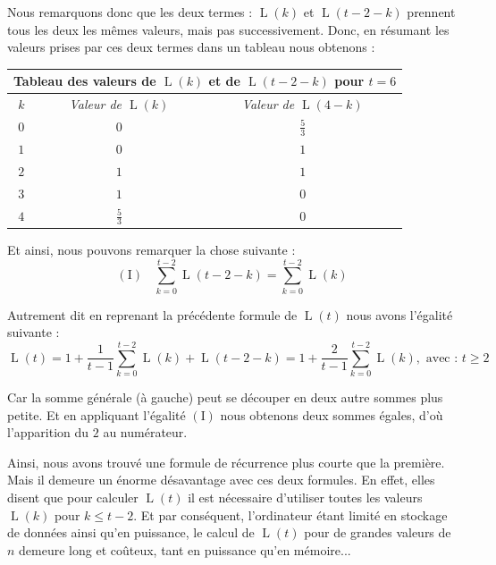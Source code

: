 \documentclass[a4paper,francais,11pt]{article}
\begin{document}
Nous remarquons donc que les deux termes : $\operatorname{L}\left(k\right)$ et $\operatorname{L}\left(t-2-k\right)$ prennent tous les deux les mêmes valeurs, mais pas successivement. Donc, en résumant les valeurs prises par ces deux termes dans un tableau nous obtenons :
\begin{center}
\begin{tabular}{|c||c|c|}
    \hline
    \multicolumn{3}{|c|}{\textbf{Tableau des valeurs de $\operatorname{L}\left(k\right)$ et de $\operatorname{L}\left(t-2-k\right)$ pour $t=6$}} \\ \hline\hline
        \multirow{1}{*}{\emph{$k$}} & \emph{Valeur de $\operatorname{L}\left(k\right)$} & \emph{Valeur de $\operatorname{L}\left(4-k\right)$} \\ \hline\hline
        \multirow{1}{*}{$0$} & $0$ & $\frac{5}{3}$ \\ \hline
        \multirow{1}{*}{$1$} & $0$ & $1$ \\ \hline
        \multirow{1}{*}{$2$} & $1$ & $1$ \\ \hline
        \multirow{1}{*}{$3$} & $1$ & $0$ \\ \hline
        \multirow{1}{*}{$4$} & $\frac{5}{3}$ & $0$ \\
    \hline
\end{tabular}
\end{center}

Et ainsi, nous pouvons remarquer la chose suivante :
\[(\text{I})\ \ \ \ \sum_{k=0}^{t-2}\operatorname{L}\left(t-2-k\right)=\sum_{k=0}^{t-2}\operatorname{L}\left(k\right)\]

Autrement dit en reprenant la précédente formule de $\operatorname{L}\left(t\right)$ nous avons l'égalité suivante :
\[\operatorname{L}\left(t\right)=1+\frac{1}{t-1}\sum_{k=0}^{t-2}\operatorname{L}\left(k\right) + \operatorname{L}\left(t-2-k\right)=1+\frac{2}{t-1}\sum_{k=0}^{t-2}\operatorname{L}\left(k\right),\text{ avec : $t\geqslant2$}\]

Car la somme générale (à gauche) peut se découper en deux autre sommes plus petite. Et en appliquant l'égalité $(\text{I})$ nous obtenons deux sommes égales, d'où l'apparition du $2$ au numérateur.

Ainsi, nous avons trouvé une formule de récurrence plus courte que la première. Mais il demeure un énorme désavantage avec ces deux formules. En effet, elles disent que pour calculer $\operatorname{L}\left(t\right)$ il est nécessaire d'utiliser toutes les valeurs $\operatorname{L}\left(k\right)$ pour $k\leqslant t-2$. Et par conséquent, l'ordinateur étant limité en stockage de données ainsi qu'en puissance, le calcul de $\operatorname{L}\left(t\right)$ pour de grandes valeurs de $n$ demeure long et coûteux, tant en puissance qu'en mémoire...
\end{document}

